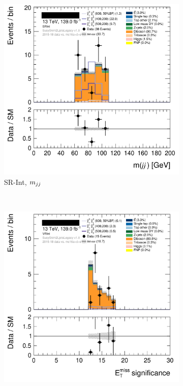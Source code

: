 \begin{figure}[tp]
\begin{subfigure}{0.48\textwidth}
\includegraphics[width=\textwidth]{figures/2ljets_def_mjj_SRInt.png}
\caption{SR-Int, $m_{jj}$}
\end{subfigure}
\\[0.5em]
\begin{subfigure}{0.48\textwidth}
\centering
\includegraphics[width=\textwidth]{figures/2ljets_def_met_Sign_VRInt.png}

\end{subfigure}
\end{figure}
